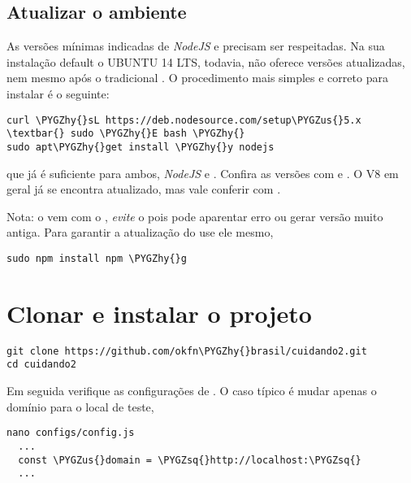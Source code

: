\documentclass[letterpaper,10pt,portuges]{sphinxmanual}
\def\PYGZus{\char`\_}
\def\PYGZhy{\char`\-}
\def\PYGZsq{\char`\'}
\renewcommand\PYGZsq{\textquotesingle}
\begin{document}
\section{Atualizar o ambiente}
\label{install-site:atualizar-o-ambiente}
As versões mínimas indicadas de \emph{NodeJS} e  precisam ser
respeitadas. Na sua instalação default o UBUNTU 14 LTS, todavia, não
oferece versões atualizadas, nem mesmo após o tradicional
. O procedimento mais simples e correto para instalar
é o seguinte:

\begin{Verbatim}[commandchars=\\\{\}]
curl \PYGZhy{}sL https://deb.nodesource.com/setup\PYGZus{}5.x \textbar{} sudo \PYGZhy{}E bash \PYGZhy{}
sudo apt\PYGZhy{}get install \PYGZhy{}y nodejs
\end{Verbatim}

que já é suficiente para ambos, \emph{NodeJS} e . Confira as versões
com  e . O V8 em geral já se encontra
atualizado, mas vale conferir com .

Nota: o  vem com o , \emph{evite} o 
pois pode aparentar erro ou gerar versão muito antiga. Para garantir a
atualização do  use ele mesmo,

\begin{Verbatim}[commandchars=\\\{\}]
sudo npm install npm \PYGZhy{}g
\end{Verbatim}


\chapter{Clonar e instalar o projeto}
\label{install-site:clonar-e-instalar-o-projeto}
\begin{Verbatim}[commandchars=\\\{\}]
git clone https://github.com/okfn\PYGZhy{}brasil/cuidando2.git
cd cuidando2
\end{Verbatim}

Em seguida verifique as configurações de . O caso
típico é mudar apenas o domínio para o local de teste,

\begin{Verbatim}[commandchars=\\\{\}]
nano configs/config.js
  ...
  const \PYGZus{}domain = \PYGZsq{}http://localhost:\PYGZsq{}
  ...
\end{Verbatim}
\end{document}
